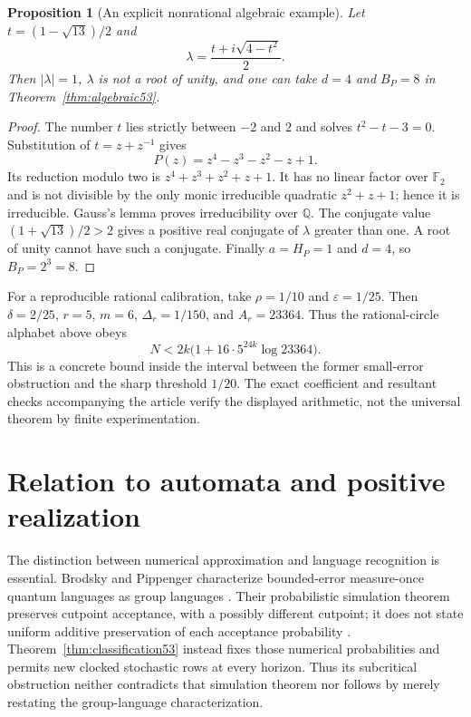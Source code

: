 \documentclass[11pt]{amsart}
\numberwithin{equation}{section}
\newtheorem{proposition}[theorem]{Proposition}
\theoremstyle{definition}
\theoremstyle{remark}
\begin{document}
\begin{proposition}[An explicit nonrational algebraic example]\label{prop:salem53}
Let $t=(1-\sqrt{13})/2$ and
\[
 \lambda=\frac{t+i\sqrt{4-t^2}}2.
\]
Then $|\lambda|=1$, $\lambda$ is not a root of unity, and one can take $d=4$ and $B_P=8$ in Theorem~\ref{thm:algebraic53}.
\end{proposition}
\begin{proof}
The number $t$ lies strictly between $-2$ and $2$ and solves $t^2-t-3=0$. Substitution of $t=z+z^{-1}$ gives
\[
                       P(z)=z^4-z^3-z^2-z+1.
\]
Its reduction modulo two is $z^4+z^3+z^2+z+1$. It has no linear factor over $\mathbb F_2$ and is not divisible by the only monic irreducible quadratic $z^2+z+1$; hence it is irreducible. Gauss's lemma proves irreducibility over $\mathbb Q$. The conjugate value $(1+\sqrt{13})/2>2$ gives a positive real conjugate of $\lambda$ greater than one. A root of unity cannot have such a conjugate. Finally $a=H_P=1$ and $d=4$, so $B_P=2^3=8$.
\end{proof}
For a reproducible rational calibration, take $\rho=1/10$ and $\varepsilon=1/25$. Then $\delta=2/25$, $r=5$, $m=6$, $\Delta_r=1/150$, and $A_r=23364$. Thus the rational-circle alphabet above obeys
\[
                 N<2k\bigl(1+16\cdot5^{24k}\log23364\bigr).
\]
This is a concrete bound inside the interval between the former small-error obstruction and the sharp threshold $1/20$. The exact coefficient and resultant checks accompanying the article verify the displayed arithmetic, not the universal theorem by finite experimentation.

\section{Relation to automata and positive realization}\label{sec:comparison53}
The distinction between numerical approximation and language recognition is essential. Brodsky and Pippenger characterize bounded-error measure-once quantum languages as group languages \cite[Theorem 3.3]{BP}. Their probabilistic simulation theorem preserves cutpoint acceptance, with a possibly different cutpoint; it does not state uniform additive preservation of each acceptance probability \cite[Theorem 3.6]{BP}. Theorem~\ref{thm:classification53} instead fixes those numerical probabilities and permits new clocked stochastic rows at every horizon. Thus its subcritical obstruction neither contradicts that simulation theorem nor follows by merely restating the group-language characterization.
\end{document}
